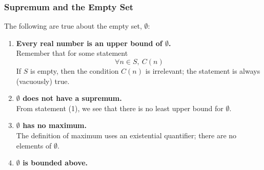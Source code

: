 \documentclass[10pt]{article}
\begin{document}
\subsubsection{Supremum and the Empty Set}
The following are true about the empty set, $\emptyset$:
\begin{enumerate}
    \item \textbf{Every real number is an upper bound of $\emptyset$.} \\
          Remember that for some statement
          $$\forall n\in S,~C(n)$$
          If $S$ is empty, then the condition $C(n)$ is irrelevant; the statement is always (vacuously) true.
    \item \textbf{$\emptyset$ does not have a supremum.} \\
          From statement (1), we see that there is no least upper bound for $\emptyset$.
    \item \textbf{$\emptyset$ has no maximum.} \\
          The definition of maximum uses an existential quantifier; there are no elements of $\emptyset$.
    \item \textbf{$\emptyset$ is bounded above.}
\end{enumerate}
\end{document}
